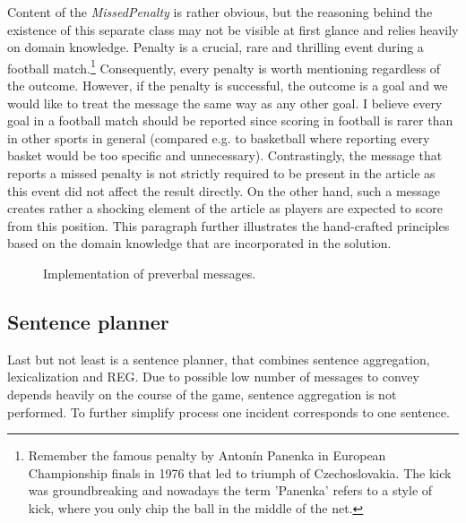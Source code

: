 Content of the \textit{MissedPenalty} is rather obvious, but the reasoning behind the existence of this separate class may not be visible at first glance and relies heavily on domain knowledge. Penalty is a crucial, rare and thrilling event during a football match.\footnote{Remember the famous penalty by Antonín Panenka in European Championship finals in 1976 that led to triumph of Czechoslovakia. The kick was groundbreaking and nowadays the term 'Panenka' refers to a style of kick, where you only chip the ball in the middle of the net.} Consequently, every penalty is worth mentioning regardless of the outcome. However, if the penalty is successful, the outcome is a goal and we would like to treat the message the same way as any other goal. I believe every goal in a football match should be reported since scoring in football is rarer than in other sports in general (compared e.g. to basketball where reporting every basket would be too specific and unnecessary). Contrastingly, the message that reports a missed penalty is not strictly required to be present in the article as this event did not affect the result directly. On the other hand, such a message creates rather a shocking element of the article as players are expected to score from this position. This paragraph further illustrates the hand-crafted principles based on the domain knowledge that are incorporated in the solution.

\begin{figure}[h]
	\caption{Implementation of preverbal messages.}
	\label{fig:message}
\end{figure} 

\subsection{Sentence planner}
Last but not least is a sentence planner, that combines sentence aggregation, lexicalization and REG. Due to possible low number of messages to convey depends heavily on the course of the game, sentence aggregation is not performed. To further simplify process one incident corresponds to one sentence.


